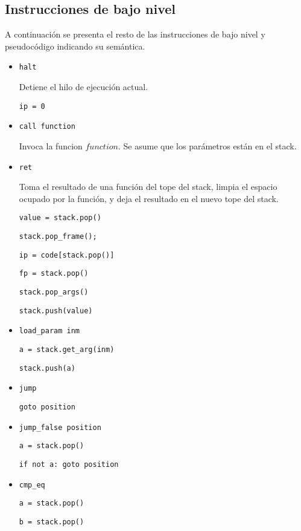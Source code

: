 

\subsection{Instrucciones de bajo nivel}

  A continuación se presenta el resto de las instrucciones
de bajo nivel y pseudocódigo indicando su semántica.

\begin{itemize}

\item \texttt{halt}

  Detiene el hilo de ejecución actual.

  \texttt{ip = 0} 

\item \texttt{call function}

  Invoca la funcion $function$.
  Se asume que los parámetros están en el stack.

\item \texttt{ret}

  Toma el resultado de una función del tope del stack,
  limpia el espacio ocupado por la función,
  y deja el resultado en el nuevo tope del stack.

  \texttt{value = stack.pop()}

  \texttt{stack.pop\_frame();}

  \texttt{ip = code[stack.pop()]}

  \texttt{fp = stack.pop()}

  \texttt{stack.pop\_args()}

  \texttt{stack.push(value)}

\item \texttt{load\_param inm}

  \texttt{a = stack.get\_arg(inm)}

  \texttt{stack.push(a)}

\item \texttt{jump}

  \texttt{goto position}

\item \texttt{jump\_false position}

  \texttt{a = stack.pop()}

  \texttt{if not a: goto position}

\item \texttt{cmp\_eq}

  \texttt{a = stack.pop()}

  \texttt{b = stack.pop()}


\end{itemize}
